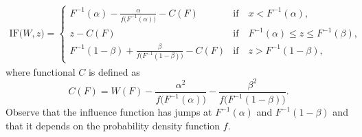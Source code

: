 \documentclass[a4paper,11pt]{scrreprt}
\begin{document}
\begin{align*}
   \mathrm{IF}\big(W, z\big) = 
   \begin{cases}
      F^{-1}(\alpha) - \frac{\alpha}{f\big(F^{-1}(\alpha)\big)} - C(F) & \text{if} \quad x < F^{-1}(\alpha),\\
      z - C(F) & \text{if} \quad F^{-1}(\alpha) \leq z \leq F^{-1}(\beta),\\
      F^{-1}(1-\beta) + \frac{\beta}{f\big(F^{-1}(1-\beta)\big)}- C(F) & \text{if} \quad z > F^{-1}(1-\beta), 
   \end{cases}
\end{align*}
\noindent where functional $C$ is defined as
\begin{equation*}
   C(F) = W(F) - \frac{\alpha^2}{f\big(F^{-1}(\alpha)\big)} - \frac{\beta^2}{f\big(F^{-1}(1-\beta)\big)}. 
\end{equation*}
\noindent Observe that the influence function has jumps at $F^{-1}(\alpha)$ and $F^{-1}(1-\beta)$ and that it depends on the probability density function $f$. 

\end{document}
